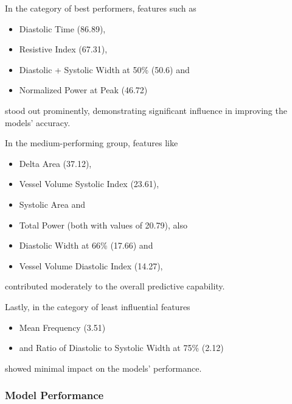 In the category of best performers, features such as
\begin{itemize}
    \item Diastolic Time (86.89),
    \item Resistive Index (67.31),
    \item Diastolic + Systolic Width at 50\% (50.6) and
    \item Normalized Power at Peak (46.72)
\end{itemize}
stood out prominently, demonstrating significant influence in improving the models' accuracy.

In the medium-performing group, features like
\begin{itemize}
    \item Delta Area (37.12),
    \item Vessel Volume Systolic Index (23.61),
    \item Systolic Area and
    \item Total Power (both with values of 20.79), also
    \item Diastolic Width at 66\% (17.66) and
    \item Vessel Volume Diastolic Index (14.27),
\end{itemize}
contributed moderately to the overall predictive capability.

Lastly, in the category of least influential features
\begin{itemize}
    \item Mean Frequency (3.51)
    \item and Ratio of Diastolic to Systolic Width at 75\% (2.12)
\end{itemize}
showed minimal impact on the models' performance.

\subsubsection{Model Performance}

